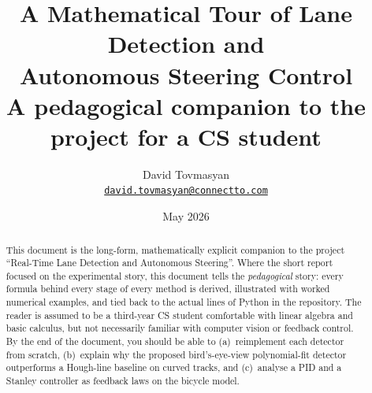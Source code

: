 \documentclass[11pt,a4paper]{article}
\title{
  \vspace{-1em}
  \textbf{A Mathematical Tour of Lane Detection and\\
  Autonomous Steering Control} \\[0.3em]
  \large A pedagogical companion to the project for a CS student}
\author{David Tovmasyan \\
  \href{mailto:david.tovmasyan@connectto.com}{\texttt{david.tovmasyan@connectto.com}}}
\date{May 2026}
\theoremstyle{definition}
\begin{document}
\maketitle

\begin{abstract}
\noindent
This document is the long-form, mathematically explicit companion to
the project ``Real-Time Lane Detection and Autonomous Steering''.
Where the short report focused on the experimental story, this
document tells the \emph{pedagogical} story: every formula behind every
stage of every method is derived, illustrated with worked numerical
examples, and tied back to the actual lines of Python in the
repository. The reader is assumed to be a third-year CS student
comfortable with linear algebra and basic calculus, but not
necessarily familiar with computer vision or feedback control. By the
end of the document, you should be able to (a)~reimplement each
detector from scratch, (b)~explain why the proposed bird's-eye-view
polynomial-fit detector outperforms a Hough-line baseline on curved
tracks, and (c)~analyse a PID and a Stanley controller as feedback
laws on the bicycle model.
\end{abstract}

\vspace{0.5em}
{\small\tableofcontents}

\vspace{1em}




\end{document}
